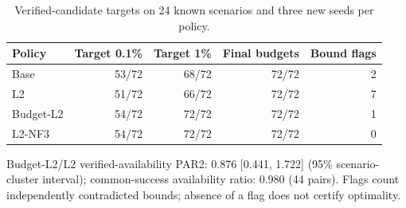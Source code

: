 \begin{table}[htbp]
\centering
\small
\caption{Verified-candidate targets on 24 known scenarios and three new seeds per policy.}
\label{tab:orf-verified-candidates}
\begin{tabular}{lrrrr}
\toprule
Policy & Target 0.1\% & Target 1\% & Final budgets & Bound flags \\
\midrule
Base & 53/72 & 68/72 & 72/72 & 2 \\
L2 & 51/72 & 66/72 & 72/72 & 7 \\
Budget-L2 & 54/72 & 72/72 & 72/72 & 1 \\
L2-NF3 & 54/72 & 72/72 & 72/72 & 0 \\
\bottomrule
\end{tabular}
\par\smallskip
\begin{minipage}{\linewidth}\footnotesize
Budget-L2/L2 verified-availability PAR2: 0.876 [0.441, 1.722] (95\% scenario-cluster interval); common-success availability ratio: 0.980 (44 pairs). Flags count independently contradicted bounds; absence of a flag does not certify optimality.
\end{minipage}
\end{table}
